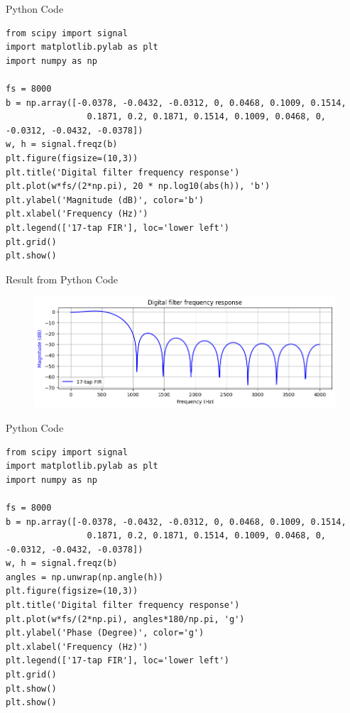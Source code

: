 \documentclass[pdflatex,compress,mathserif]{beamer}
\begin{document}
\begin{frame}[fragile]{Python Code}
    \begin{verbatim}
from scipy import signal
import matplotlib.pylab as plt
import numpy as np

fs = 8000
b = np.array([-0.0378, -0.0432, -0.0312, 0, 0.0468, 0.1009, 0.1514, 
                0.1871, 0.2, 0.1871, 0.1514, 0.1009, 0.0468, 0, -0.0312, -0.0432, -0.0378])
w, h = signal.freqz(b)
plt.figure(figsize=(10,3))
plt.title('Digital filter frequency response')
plt.plot(w*fs/(2*np.pi), 20 * np.log10(abs(h)), 'b')
plt.ylabel('Magnitude (dB)', color='b')
plt.xlabel('Frequency (Hz)')
plt.legend(['17-tap FIR'], loc='lower left')
plt.grid()
plt.show()
    \end{verbatim}
\end{frame}

\begin{frame}{Result from Python Code}
    \begin{figure}
        \centering
        \includegraphics[width=\linewidth]{./img/img14.png}
    \end{figure}
\end{frame}

\begin{frame}[fragile]{Python Code}
    \begin{verbatim}
from scipy import signal
import matplotlib.pylab as plt
import numpy as np

fs = 8000
b = np.array([-0.0378, -0.0432, -0.0312, 0, 0.0468, 0.1009, 0.1514, 
                0.1871, 0.2, 0.1871, 0.1514, 0.1009, 0.0468, 0, -0.0312, -0.0432, -0.0378])
w, h = signal.freqz(b)
angles = np.unwrap(np.angle(h))
plt.figure(figsize=(10,3))
plt.title('Digital filter frequency response')
plt.plot(w*fs/(2*np.pi), angles*180/np.pi, 'g')
plt.ylabel('Phase (Degree)', color='g')
plt.xlabel('Frequency (Hz)')
plt.legend(['17-tap FIR'], loc='lower left')
plt.grid()
plt.show()
plt.show()
    \end{verbatim}
\end{frame}
\end{document}
